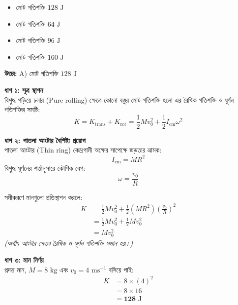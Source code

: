 \documentclass[12pt, a4paper]{article}
\begin{document}
\begin{itemize}[label={}, leftmargin=1cm, itemsep=0.5em]
    \item[\textbf{A)}] মোট গতিশক্তি $128\text{ J}$
    \item[\textbf{B)}] মোট গতিশক্তি $64\text{ J}$
    \item[\textbf{C)}] মোট গতিশক্তি $96\text{ J}$
    \item[\textbf{D)}] মোট গতিশক্তি $160\text{ J}$
\end{itemize}

\vspace{0.5em}
\begin{tcolorbox}[answerbox]
    \textbf{\color{success} উত্তর:} A) মোট গতিশক্তি $128\text{ J}$
\end{tcolorbox}
\vspace{1em}

\begin{tcolorbox}[solutionbox={সমাধান (Solution)}]
    \noindent
    \textbf{ধাপ ১: সূত্র স্থাপন} \\
    বিশুদ্ধ গড়িয়ে চলার (Pure rolling) ক্ষেত্রে কোনো বস্তুর মোট গতিশক্তি হলো এর রৈখিক গতিশক্তি ও ঘূর্ণন গতিশক্তির সমষ্টি:
    \[ K = K_{\text{trans}} + K_{\text{rot}} = \frac{1}{2} M v_0^2 + \frac{1}{2} I_{\text{cm}} \omega^2 \]
    
    \vspace{0.5em}
    \noindent\textbf{ধাপ ২: পাতলা আংটার বৈশিষ্ট্য প্রয়োগ} \\
    পাতলা আংটার (Thin ring) কেন্দ্রগামী অক্ষের সাপেক্ষে জড়তার ভ্রামক:
    \[ I_{\text{cm}} = M R^2 \]
    বিশুদ্ধ ঘূর্ণনের শর্তানুসারে কৌণিক বেগ:
    \[ \omega = \frac{v_0}{R} \]
    
    সমীকরণে মানগুলো প্রতিস্থাপন করলে:
    \begin{align*}
        K &= \frac{1}{2} M v_0^2 + \frac{1}{2} (M R^2) \left(\frac{v_0}{R}\right)^2 \\
          &= \frac{1}{2} M v_0^2 + \frac{1}{2} M v_0^2 \\
          &= M v_0^2
    \end{align*}
    \textit{(অর্থাৎ আংটার ক্ষেত্রে রৈখিক ও ঘূর্ণন গতিশক্তি সমান হয়।)}
    
    \vspace{0.5em}
    \noindent\textbf{ধাপ ৩: মান নির্ণয়} \\
    প্রদত্ত মান, $M = 8\text{ kg}$ এবং $v_0 = 4\text{ ms}^{-1}$ বসিয়ে পাই:
    \begin{align*}
        K &= 8 \times (4)^2 \\
          &= 8 \times 16 \\
          &= \mathbf{128}\text{ J}
    \end{align*}
\end{tcolorbox}
\end{document}

